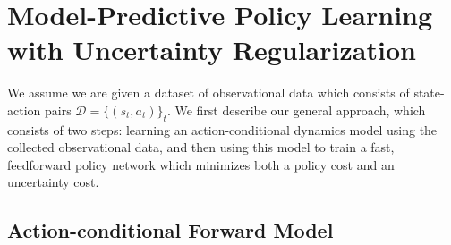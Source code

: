 \documentclass{article} %
\begin{document}

\section{Model-Predictive Policy Learning with Uncertainty Regularization}

We assume we are given a dataset of observational data which consists of state-action pairs $\mathcal{D} = \{(s_t, a_t)\}_t$.
We first describe our general approach, which consists of two steps: learning an action-conditional dynamics model using the collected observational data, and then using this model to train a fast, feedforward policy network which minimizes both a policy cost and an uncertainty cost.

\subsection{Action-conditional Forward Model}
\end{document}
